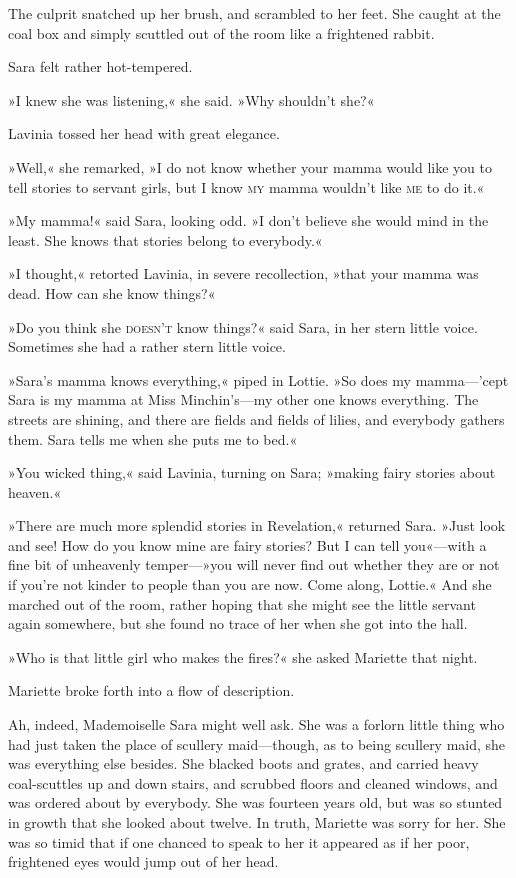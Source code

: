 The culprit snatched up her brush, and scrambled to her feet. She caught at the coal box and simply scuttled out of the room like a frightened rabbit.

Sara felt rather hot-tempered.

»I knew she was listening,« she said. »Why shouldn't she?«

Lavinia tossed her head with great elegance.

»Well,« she remarked, »I do not know whether your mamma would like you to tell stories to servant girls, but I know \textsc{my} mamma wouldn't like \textsc{me} to do it.«

»My mamma!« said Sara, looking odd. »I don't believe she would mind in the least. She knows that stories belong to everybody.«

»I thought,« retorted Lavinia, in severe recollection, »that your mamma was dead. How can she know things?«

»Do you think she \textsc{doesn't} know things?« said Sara, in her stern little voice. Sometimes she had a rather stern little voice.

»Sara's mamma knows everything,« piped in Lottie. »So does my mamma—'cept Sara is my mamma at Miss Minchin's—my other one knows everything. The streets are shining, and there are fields and fields of lilies, and everybody gathers them. Sara tells me when she puts me to bed.«

»You wicked thing,« said Lavinia, turning on Sara; »making fairy stories about heaven.«

»There are much more splendid stories in Revelation,« returned Sara. »Just look and see! How do you know mine are fairy stories? But I can tell you«—with a fine bit of unheavenly temper—»you will never find out whether they are or not if you're not kinder to people than you are now. Come along, Lottie.« And she marched out of the room, rather hoping that she might see the little servant again somewhere, but she found no trace of her when she got into the hall.

»Who is that little girl who makes the fires?« she asked Mariette that night.

Mariette broke forth into a flow of description.

Ah, indeed, Mademoiselle Sara might well ask. She was a forlorn little thing who had just taken the place of scullery maid—though, as to being scullery maid, she was everything else besides. She blacked boots and grates, and carried heavy coal-scuttles up and down stairs, and scrubbed floors and cleaned windows, and was ordered about by everybody. She was fourteen years old, but was so stunted in growth that she looked about twelve. In truth, Mariette was sorry for her. She was so timid that if one chanced to speak to her it appeared as if her poor, frightened eyes would jump out of her head.

